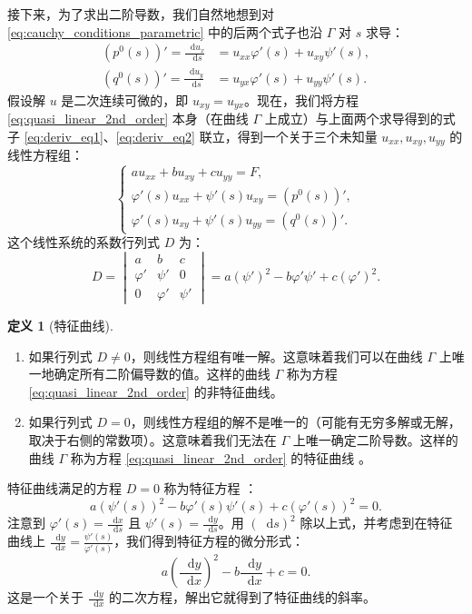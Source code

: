 \documentclass[12pt,a4paper]{article}
\newcommand{\diff}{\mathop{}\!\mathrm{d}}
\numberwithin{subsection}{section}   %
\numberwithin{subsubsection}{subsection}
\theoremstyle{plain}
\theoremstyle{definition}
\newtheorem{definition}[theorem]{定义}
\theoremstyle{remark}
\theoremstyle{remark}
\begin{document}
	接下来，为了求出二阶导数，我们自然地想到对 \eqref{eq:cauchy_conditions_parametric} 中的后两个式子也沿 \(\Gamma\) 对 \(s\) 求导：
	\begin{align}
		(p^0(s))' = \frac{\diff u_x}{\diff s} &= u_{xx}\varphi'(s) + u_{xy}\psi'(s), \label{eq:deriv_eq1} \\
		(q^0(s))' = \frac{\diff u_y}{\diff s} &= u_{yx}\varphi'(s) + u_{yy}\psi'(s). \label{eq:deriv_eq2}
	\end{align}
	假设解 \(u\) 是二次连续可微的，即 \(u_{xy} = u_{yx}\)。现在，我们将方程 \eqref{eq:quasi_linear_2nd_order} 本身（在曲线 \(\Gamma\) 上成立）与上面两个求导得到的式子 \eqref{eq:deriv_eq1}、\eqref{eq:deriv_eq2} 联立，得到一个关于三个未知量 \(u_{xx}, u_{xy}, u_{yy}\) 的线性方程组：
	\begin{equation}
		\begin{cases}
			a u_{xx} + b u_{xy} + c u_{yy} = F, \\
			\varphi'(s) u_{xx} + \psi'(s) u_{xy} = (p^0(s))', \\
			\varphi'(s) u_{xy} + \psi'(s) u_{yy} = (q^0(s))'.
		\end{cases}
	\end{equation}
	这个线性系统的系数行列式 \(D\) 为：
	\begin{equation}
		D = 
		\begin{vmatrix}
			a & b & c \\
			\varphi' & \psi' & 0 \\
			0 & \varphi' & \psi'
		\end{vmatrix}
		= a(\psi')^2 - b\varphi'\psi' + c(\varphi')^2.
	\end{equation}
	
	\begin{definition}[特征曲线]
		\begin{enumerate}[label=(\roman*)]
			\item 如果行列式 \(D \neq 0\)，则线性方程组有唯一解。这意味着我们可以在曲线 \(\Gamma\) 上唯一地确定所有二阶偏导数的值。这样的曲线 \(\Gamma\) 称为方程 \eqref{eq:quasi_linear_2nd_order} 的非特征曲线。
			\item 如果行列式 \(D = 0\)，则线性方程组的解不是唯一的（可能有无穷多解或无解，取决于右侧的常数项）。这意味着我们无法在 \(\Gamma\) 上唯一确定二阶导数。这样的曲线 \(\Gamma\) 称为方程 \eqref{eq:quasi_linear_2nd_order} 的特征曲线 。
		\end{enumerate}
	\end{definition}
	
	特征曲线满足的方程 \(D=0\) 称为特征方程 ：
	\begin{equation}\label{eq:characteristic_eq_parametric}
		a(\psi'(s))^2 - b\varphi'(s)\psi'(s) + c(\varphi'(s))^2 = 0.
	\end{equation}
	注意到 \(\varphi'(s) = \frac{\diff x}{\diff s}\) 且 \(\psi'(s) = \frac{\diff y}{\diff s}\)。用 \((\diff s)^2\) 除以上式，并考虑到在特征曲线上 \(\frac{\diff y}{\diff x} = \frac{\psi'(s)}{\varphi'(s)}\)，我们得到特征方程的微分形式：
	\begin{equation}\label{eq:characteristic_ode}
		a \left(\frac{\diff y}{\diff x}\right)^2 - b \frac{\diff y}{\diff x} + c = 0.
	\end{equation}
	这是一个关于 \(\frac{\diff y}{\diff x}\) 的二次方程，解出它就得到了特征曲线的斜率。
	
\end{document}

